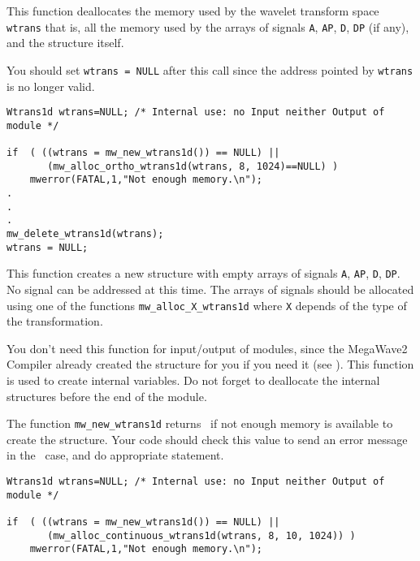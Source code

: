 \newpage %

\Description
This function deallocates the memory used by the wavelet transform space \verb+wtrans+ that is, all the memory used by the arrays of signals \verb+A+, \verb+AP+, \verb+D+, \verb+DP+ (if any), and the structure itself. 

You should set \verb+wtrans = NULL+ after this call since the address pointed
by \verb+wtrans+ is no longer valid.

\Next
\Example
\begin{verbatim}
Wtrans1d wtrans=NULL; /* Internal use: no Input neither Output of module */

if  ( ((wtrans = mw_new_wtrans1d()) == NULL) ||  
       (mw_alloc_ortho_wtrans1d(wtrans, 8, 1024)==NULL) )
    mwerror(FATAL,1,"Not enough memory.\n");
.
.
.
mw_delete_wtrans1d(wtrans);
wtrans = NULL;
\end{verbatim}

\newpage %


\Description
This function creates a new \wtransud structure with empty arrays of signals \verb+A+, \verb+AP+, \verb+D+, \verb+DP+.
No signal can be addressed at this time.
The arrays of signals should  be allocated using one of the functions \verb+mw_alloc_X_wtrans1d+ where \verb+X+ depends of the type of the transformation.

You don't need this function for input/output of modules, since the MegaWave2
Compiler already created the structure for you if you need it (see \volI). 
This function is used to create internal variables.
Do not forget to deallocate the internal structures before the end
of the module.

The function \verb+mw_new_wtrans1d+ returns \Null\ if not enough memory is available to create the structure. Your code should check this value to send an
error message in the \Null\ case, and do appropriate statement.

\Next
\Example
\begin{verbatim}
Wtrans1d wtrans=NULL; /* Internal use: no Input neither Output of module */

if  ( ((wtrans = mw_new_wtrans1d()) == NULL) ||  
       (mw_alloc_continuous_wtrans1d(wtrans, 8, 10, 1024)) )
    mwerror(FATAL,1,"Not enough memory.\n");
\end{verbatim}

\newpage %

